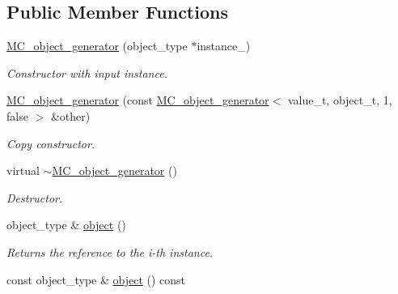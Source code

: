 \subsection*{Public Member Functions}
\begin{DoxyCompactItemize}
\item 
\hypertarget{a00365_a01b2f0b30666c40d8819829faacf2175}{\hyperlink{a00365_a01b2f0b30666c40d8819829faacf2175}{M\-C\-\_\-object\-\_\-generator} (object\-\_\-type $\ast$instance\-\_\-)}\label{a00365_a01b2f0b30666c40d8819829faacf2175}

\begin{DoxyCompactList}\small\item\em Constructor with input instance. \end{DoxyCompactList}\item 
\hypertarget{a00365_aea470dc57111f7cee37f6320eb868d89}{\hyperlink{a00365_aea470dc57111f7cee37f6320eb868d89}{M\-C\-\_\-object\-\_\-generator} (const \hyperlink{a00364}{M\-C\-\_\-object\-\_\-generator}$<$ value\-\_\-t, object\-\_\-t, 1, false $>$ \&other)}\label{a00365_aea470dc57111f7cee37f6320eb868d89}

\begin{DoxyCompactList}\small\item\em Copy constructor. \end{DoxyCompactList}\item 
\hypertarget{a00365_a1c1d84bab5e55603918d77a19cf6a6c5}{virtual \hyperlink{a00365_a1c1d84bab5e55603918d77a19cf6a6c5}{$\sim$\-M\-C\-\_\-object\-\_\-generator} ()}\label{a00365_a1c1d84bab5e55603918d77a19cf6a6c5}

\begin{DoxyCompactList}\small\item\em Destructor. \end{DoxyCompactList}\item 
\hypertarget{a00365_afb029db7b8d4b1a25141c301bb155f1a}{object\-\_\-type \& \hyperlink{a00365_afb029db7b8d4b1a25141c301bb155f1a}{object} ()}\label{a00365_afb029db7b8d4b1a25141c301bb155f1a}

\begin{DoxyCompactList}\small\item\em Returns the reference to the i-\/th instance. \end{DoxyCompactList}\item 
\hypertarget{a00365_a0a2ca9ba4f588835e0f01024a47087fa}{const object\-\_\-type \& \hyperlink{a00365_a0a2ca9ba4f588835e0f01024a47087fa}{object} () const }\label{a00365_a0a2ca9ba4f588835e0f01024a47087fa}


\end{DoxyCompactItemize}
